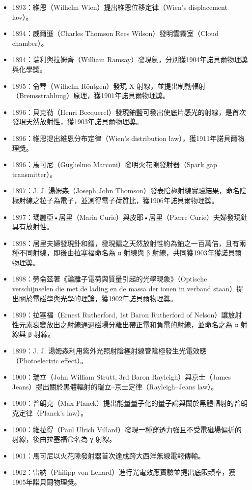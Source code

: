 \documentclass[a4paper,12pt]{article}
\begin{document}
\begin{itemize}
\item 1893：維恩（Wilhelm Wien）提出維恩位移定律（Wien's displacement law）。
\item 1894：威爾遜（Charles Thomson Rees Wilson）發明雲霧室（Cloud chamber）。
\item 1894：瑞利與拉姆齊（William Ramsay）發現氬，分別獲1904年諾貝爾物理獎與化學獎。
\item 1895：侖琴（Wilhelm Röntgen）發現 X 射線，並提出制動輻射（Bremsstrahlung）原理，獲1901年諾貝爾物理獎。
\item 1896：貝克勒（Henri Becquerel）發現鈾鹽可發出使底片感光的射線，是首次發現天然放射性，獲1903年諾貝爾物理獎。
\item 1896：維恩提出維恩分布定律（Wien's distribution law），獲1911年諾貝爾物理獎。
\item 1896：馬可尼（Guglielmo Marconi）發明火花隙發射器（Spark gap transmitter）。
\item 1897：J. J. 湯姆森（Joseph John Thomson）發表陰極射線實驗結果，命名陰極射線之粒子為電子，並測得電子荷質比，獲1906年諾貝爾物理獎。
\item 1897：瑪麗亞•居里（Maria Curie）與皮耶•居里（Pierre Curie）夫婦發現釷具有放射性。
\item 1898：居里夫婦發現釙和鐳，發現鐳之天然放射性約為鈾之一百萬倍，且有兩種不同射線，即後由拉塞福命名為 α 射線與 β 射線，共同獲1903年獲諾貝爾物理獎。
\item 1898：勞侖茲著《論離子電荷與質量引起的光學現象》（Optische verschijnselen die met de lading en de massa der ionen in verband staan）提出關於電磁學與光學的理論，獲1902年諾貝爾物理獎。
\item 1899：拉塞福（Ernest Rutherford, 1st Baron Rutherford of Nelson）讓放射性元素衰變放出之射線通過磁場分離出帶正電和負電的射線，並命名之為 α 射線與 β 射線。
\item 1899：J. J. 湯姆森利用紫外光照射陰極射線管陰極發生光電效應（Photoelectric effect）。
\item 1900：瑞立（John William Strutt, 3rd Baron Rayleigh）與京士（James Jeans）提出關於黑體輻射的瑞立–京士定律（Rayleigh–Jeans law）。
\item 1900：普朗克（Max Planck）提出能量量子化的量子論與關於黑體輻射的普朗克定律（Planck's law）。
\item 1900：維拉得（Paul Ulrich Villard）發現一種穿透力強且不受電磁場偏折的射線，後由拉塞福命名為 γ 射線。
\item 1901：馬可尼以火花隙發射器首次達成跨大西洋無線電報傳輸。
\item 1902：雷納（Philipp von Lenard）進行光電效應實驗並提出底限頻率，獲1905年諾貝爾物理獎。

\end{itemize}
\end{document}
